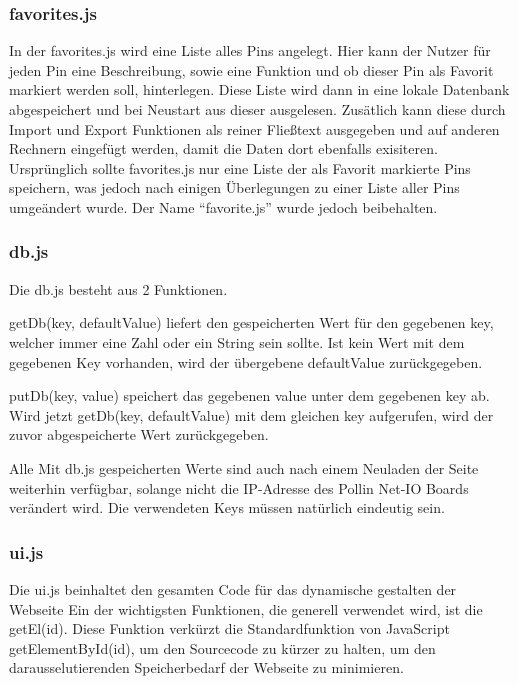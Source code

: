 \subsubsection{favorites.js}

In der favorites.js wird eine Liste alles Pins angelegt. Hier kann der Nutzer für jeden Pin eine
Beschreibung, sowie eine Funktion und ob dieser Pin als Favorit markiert werden soll, 
hinterlegen. Diese Liste wird dann in eine lokale Datenbank abgespeichert und bei Neustart aus dieser ausgelesen. 
Zusätlich kann diese durch Import und Export Funktionen als reiner Fließtext ausgegeben und auf anderen Rechnern 
eingefügt werden, damit die Daten dort ebenfalls exisiteren.\\
Ursprünglich sollte favorites.js nur eine Liste der als Favorit markierte Pins speichern, 
was jedoch nach einigen Überlegungen zu einer Liste aller Pins umgeändert wurde. Der Name 
"`favorite.js"' wurde jedoch beibehalten.

\subsubsection{db.js}
Die \textrm{db.js} besteht aus 2 Funktionen. 

\textrm{getDb(key, defaultValue)} liefert den gespeicherten Wert für den
gegebenen \textrm{key}, welcher immer eine Zahl oder ein String sein sollte. Ist
kein Wert mit dem gegebenen Key vorhanden, wird der
übergebene \textrm{defaultValue} zurückgegeben.

\textrm{putDb(key, value)} speichert das gegebenen \textrm{value} unter dem
gegebenen \textrm{key} ab. Wird jetzt \textrm{getDb(key, defaultValue)} mit dem
gleichen \textrm{key} aufgerufen, wird der zuvor abgespeicherte Wert
zurückgegeben.

Alle Mit \textrm{db.js} gespeicherten Werte sind auch nach einem Neuladen der
Seite weiterhin verfügbar, solange nicht die IP-Adresse des Pollin Net-IO Boards
verändert wird. Die verwendeten Keys müssen natürlich eindeutig sein.

\subsubsection{ui.js}
Die \textrm{ui.js} beinhaltet den gesamten Code für das dynamische gestalten der
Webseite\newline
Ein der wichtigsten Funktionen, die generell verwendet wird, ist die
\textrm{getEl(id)}.
Diese Funktion verkürzt die Standardfunktion von JavaScript
\textrm{getElementById(id)}, um den Sourcecode zu kürzer zu halten,
um den darausselutierenden Speicherbedarf der Webseite zu
minimieren.\newline

